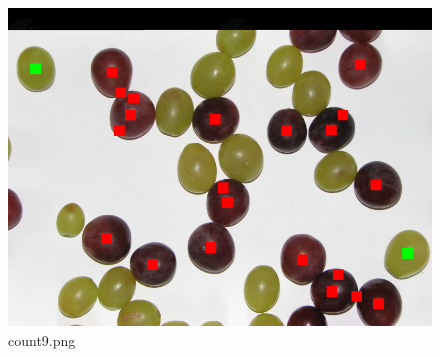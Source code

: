 \documentclass{classrep}
\begin{document}
\begin{figure}
\begin{minipage}{0.3\linewidth}
    \includegraphics[width=\textwidth]{gfx/count9_overlayed.png}
    \caption{count9.png}
    \label{fig:c9}
  \end{minipage}
\end{figure}
\end{document}
